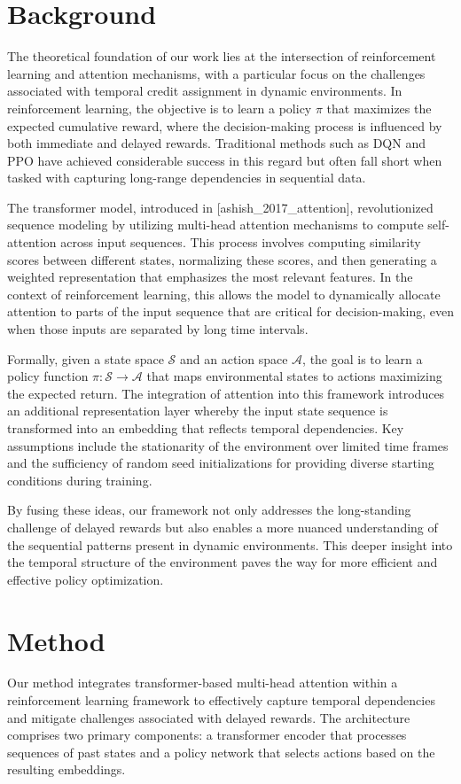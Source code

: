 \documentclass{article}
\begin{document}
\section{Background}
The theoretical foundation of our work lies at the intersection of reinforcement learning and attention mechanisms, with a particular focus on the challenges associated with temporal credit assignment in dynamic environments. In reinforcement learning, the objective is to learn a policy $\pi$ that maximizes the expected cumulative reward, where the decision-making process is influenced by both immediate and delayed rewards. Traditional methods such as DQN and PPO have achieved considerable success in this regard but often fall short when tasked with capturing long-range dependencies in sequential data.

The transformer model, introduced in [ashish_2017_attention], revolutionized sequence modeling by utilizing multi-head attention mechanisms to compute self-attention across input sequences. This process involves computing similarity scores between different states, normalizing these scores, and then generating a weighted representation that emphasizes the most relevant features. In the context of reinforcement learning, this allows the model to dynamically allocate attention to parts of the input sequence that are critical for decision-making, even when those inputs are separated by long time intervals.

Formally, given a state space $\mathcal{S}$ and an action space $\mathcal{A}$, the goal is to learn a policy function $\pi: \mathcal{S} \rightarrow \mathcal{A}$ that maps environmental states to actions maximizing the expected return. The integration of attention into this framework introduces an additional representation layer whereby the input state sequence is transformed into an embedding that reflects temporal dependencies. Key assumptions include the stationarity of the environment over limited time frames and the sufficiency of random seed initializations for providing diverse starting conditions during training.

By fusing these ideas, our framework not only addresses the long-standing challenge of delayed rewards but also enables a more nuanced understanding of the sequential patterns present in dynamic environments. This deeper insight into the temporal structure of the environment paves the way for more efficient and effective policy optimization.

\section{Method}
Our method integrates transformer-based multi-head attention within a reinforcement learning framework to effectively capture temporal dependencies and mitigate challenges associated with delayed rewards. The architecture comprises two primary components: a transformer encoder that processes sequences of past states and a policy network that selects actions based on the resulting embeddings.
\end{document}
